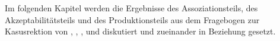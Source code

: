 Im folgenden Kapitel werden die Ergebnisse des Assoziationsteils, des Akzeptabilitätsteils und des Produktionsteils aus dem Fragebogen zur Kasusrektion von \wegen, \waehrend{}, \dank, \gegenueber{} und  diskutiert und zueinander in Beziehung gesetzt. 





